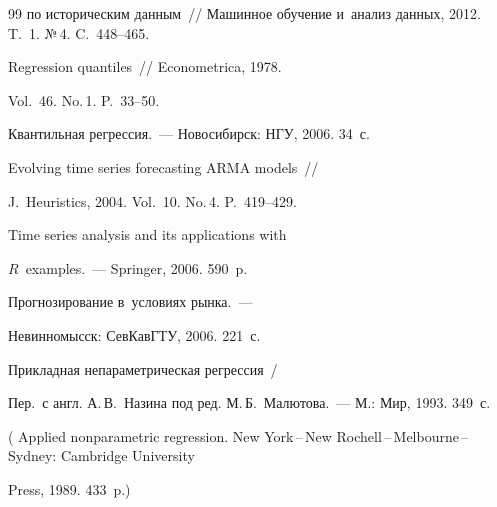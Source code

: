 {{\begin{thebibliography}{99}
по историческим данным~/\!\!/ Машинное обучение и~анализ данных, 2012.  T.~1. №\,4. C.~448--465.







  Regression quantiles~/\!\!/ Econometrica, 1978.


Vol.~46. No.\,1. P.~33--50.







 Квантильная регрессия.~--- Новосибирск: НГУ, 2006. 34~с.







 Evolving time series forecasting ARMA models~/\!\!/


J.~Heuristics, 2004. Vol.~10. No.\,4. P.~419--429.







 Time series analysis and its applications with


$R$~examples.~--- Springer, 2006. 590~p.







 Прогнозирование в~условиях рынка.~---


Невинномысск: СевКавГТУ, 2006. 221~с.







  Прикладная непараметрическая регрессия~/


Пер.\ с англ. А.\,В.~Назина под ред. М.\,Б.~Малютова.~--- М.: Мир, 1993. 349~с.


( Applied nonparametric regression. New York\,--\,New Rochell\,--\,Melbourne\,--\,Sydney: Cambridge University


Press, 1989. 433~p.)








\end{thebibliography}}}
